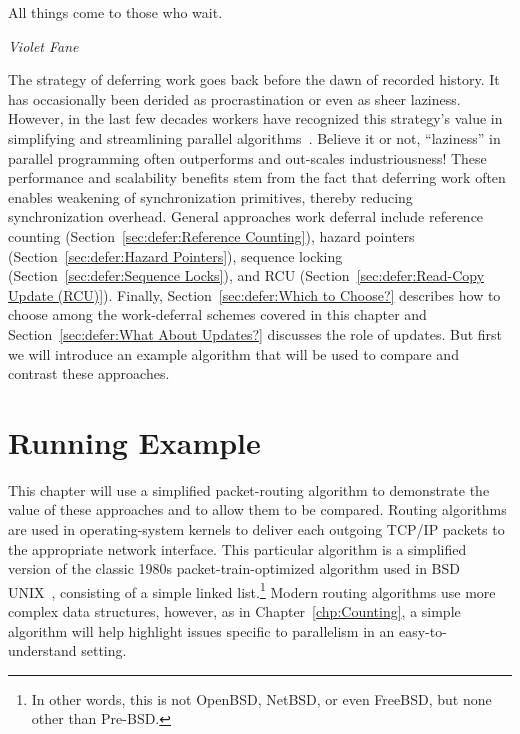 

\epigraph{All things come to those who wait.}{\emph{Violet Fane}}

The strategy of deferring work goes back before the dawn of recorded
history. It has occasionally been derided as procrastination or
even as sheer laziness.
However, in the last few decades workers have recognized this strategy's value
in simplifying and streamlining parallel algorithms~\cite{Kung80,HMassalinPhD}.
Believe it or not, ``laziness'' in parallel programming often outperforms and
out-scales industriousness!
These performance and scalability benefits stem from the fact that
deferring work often enables weakening of synchronization primitives,
thereby reducing synchronization overhead.
General approaches work deferral include
reference counting (Section~\ref{sec:defer:Reference Counting}),
hazard pointers (Section~\ref{sec:defer:Hazard Pointers}),
sequence locking (Section~\ref{sec:defer:Sequence Locks}),
and RCU (Section~\ref{sec:defer:Read-Copy Update (RCU)}).
Finally, Section~\ref{sec:defer:Which to Choose?}
describes how to choose among the work-deferral schemes covered in
this chapter and Section~\ref{sec:defer:What About Updates?}
discusses the role of updates.
But first we will introduce an example algorithm that will be used
to compare and contrast these approaches.

\section{Running Example}
\label{sec:defer:Running Example}

This chapter will use a simplified packet-routing algorithm to demonstrate
the value of these approaches and to allow them to be compared.
Routing algorithms are used in operating-system kernels to
deliver each outgoing TCP/IP packets to the appropriate network interface.
This particular algorithm is a simplified version of the classic 1980s
packet-train-optimized algorithm used in BSD UNIX~\cite{VanJacobson88},
consisting of a simple linked list.\footnote{
	In other words, this is not OpenBSD, NetBSD, or even
	FreeBSD, but none other than Pre-BSD.}
Modern routing algorithms use more complex data structures, however, as in
Chapter~\ref{chp:Counting}, a simple algorithm will
help highlight issues specific to parallelism in an
easy-to-understand setting.

